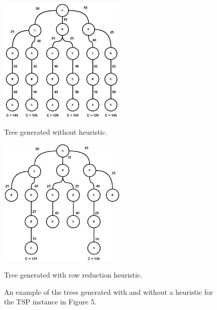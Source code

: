     \begin{figure}
        \begin{minipage}{.5\linewidth}
          \centering
          \begin{center}
            \includegraphics[width=6cm]{images/BnB-TSP-1.jpg}
        \end{center}
        \captionsetup{labelformat=empty}
        \caption{\doublespacing Tree generated without heuristic.}
        \end{minipage}%
        \begin{minipage}{.5\linewidth}
            \centering
            \begin{center}
              \includegraphics[width=6cm]{images/BnB-TSP-2.jpg}
          \end{center}
          \captionsetup{labelformat=empty}
          \caption{\doublespacing Tree generated with row reduction heuristic.}
          \end{minipage}
        \caption{\doublespacing An example of 
        the trees generated with and without a heuristic for the TSP instance in Figure 5.}
    \end{figure}

   
